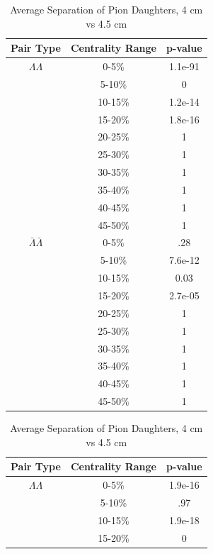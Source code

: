 \begin{table}
\begin{minipage}{18pc}
\caption {Average Separation of Pion Daughters, 4 cm vs 3.5 cm} \label{tab:AvgSepPionDaughters4cmVs35cm}
\begin{center}
\begin{tabular}{| c | c | c |}
  \hline                       
  Pair Type & Centrality Range & p-value \\
  \hline
  $\Lambda\Lambda$ & 0-5\% & 1.1e-91  \\
   & 5-10\%  & 0 \\
   & 10-15\% & 1.2e-14 \\
   & 15-20\% & 1.8e-16 \\
   & 20-25\% & 1 \\
   & 25-30\% & 1 \\
   & 30-35\% & 1 \\
   & 35-40\% & 1 \\
   & 40-45\% & 1 \\
   & 45-50\% & 1 \\
   \hline
  $\bar{\Lambda}\bar{\Lambda}$ &  0-5\% & .28 \\
   & 5-10\% & 7.6e-12 \\
   & 10-15\% & 0.03 \\
   & 15-20\% & 2.7e-05 \\
   & 20-25\% & 1 \\
   & 25-30\% & 1 \\
   & 30-35\% & 1 \\
   & 35-40\% & 1 \\
   & 40-45\% & 1 \\
   & 45-50\% & 1 \\
   \hline
\end{tabular}
\end{center}
\end{minipage}
\begin{minipage}{18pc}
\caption {Average Separation of Pion Daughters, 4 cm vs 4.5 cm} \label{tab:AvgSepPionDaughters4cmVs45cm}
\begin{center}
\begin{tabular}{| c | c | c |}
  \hline                       
  Pair Type & Centrality Range & p-value \\
  \hline
  $\Lambda\Lambda$ & 0-5\% & 1.9e-16 \\
   & 5-10\%  & .97 \\
   & 10-15\% & 1.9e-18 \\
   & 15-20\% & 0 \\

\end{tabular}
\end{center}
\end{minipage}
\end{table}
